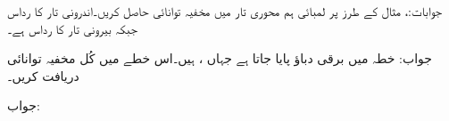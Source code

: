 جوابات:، 
مثال  کے طرز پر  لمبائی ہم محوری تار میں مخفیہ توانائی حاصل کریں۔اندرونی تار کا رداس  جبکہ بیرونی تار کا رداس  ہے۔

جواب:
خطہ  میں  برقی دباؤ پایا جاتا ہے جہاں ،  ہیں۔اس خطے میں کُل مخفیہ توانائی دریافت کریں۔

جواب:
